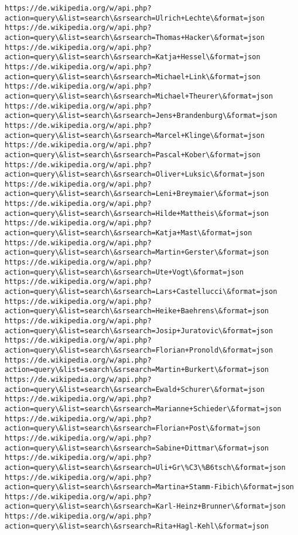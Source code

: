 \documentclass[11pt]{article}
\begin{document}
\begin{Verbatim}[commandchars=\\\{\}]
https://de.wikipedia.org/w/api.php?action=query\&list=search\&srsearch=Ulrich+Lechte\&format=json
https://de.wikipedia.org/w/api.php?action=query\&list=search\&srsearch=Thomas+Hacker\&format=json
https://de.wikipedia.org/w/api.php?action=query\&list=search\&srsearch=Katja+Hessel\&format=json
https://de.wikipedia.org/w/api.php?action=query\&list=search\&srsearch=Michael+Link\&format=json
https://de.wikipedia.org/w/api.php?action=query\&list=search\&srsearch=Michael+Theurer\&format=json
https://de.wikipedia.org/w/api.php?action=query\&list=search\&srsearch=Jens+Brandenburg\&format=json
https://de.wikipedia.org/w/api.php?action=query\&list=search\&srsearch=Marcel+Klinge\&format=json
https://de.wikipedia.org/w/api.php?action=query\&list=search\&srsearch=Pascal+Kober\&format=json
https://de.wikipedia.org/w/api.php?action=query\&list=search\&srsearch=Oliver+Luksic\&format=json
https://de.wikipedia.org/w/api.php?action=query\&list=search\&srsearch=Leni+Breymaier\&format=json
https://de.wikipedia.org/w/api.php?action=query\&list=search\&srsearch=Hilde+Mattheis\&format=json
https://de.wikipedia.org/w/api.php?action=query\&list=search\&srsearch=Katja+Mast\&format=json
https://de.wikipedia.org/w/api.php?action=query\&list=search\&srsearch=Martin+Gerster\&format=json
https://de.wikipedia.org/w/api.php?action=query\&list=search\&srsearch=Ute+Vogt\&format=json
https://de.wikipedia.org/w/api.php?action=query\&list=search\&srsearch=Lars+Castellucci\&format=json
https://de.wikipedia.org/w/api.php?action=query\&list=search\&srsearch=Heike+Baehrens\&format=json
https://de.wikipedia.org/w/api.php?action=query\&list=search\&srsearch=Josip+Juratovic\&format=json
https://de.wikipedia.org/w/api.php?action=query\&list=search\&srsearch=Florian+Pronold\&format=json
https://de.wikipedia.org/w/api.php?action=query\&list=search\&srsearch=Martin+Burkert\&format=json
https://de.wikipedia.org/w/api.php?action=query\&list=search\&srsearch=Ewald+Schurer\&format=json
https://de.wikipedia.org/w/api.php?action=query\&list=search\&srsearch=Marianne+Schieder\&format=json
https://de.wikipedia.org/w/api.php?action=query\&list=search\&srsearch=Florian+Post\&format=json
https://de.wikipedia.org/w/api.php?action=query\&list=search\&srsearch=Sabine+Dittmar\&format=json
https://de.wikipedia.org/w/api.php?action=query\&list=search\&srsearch=Uli+Gr\%C3\%B6tsch\&format=json
https://de.wikipedia.org/w/api.php?action=query\&list=search\&srsearch=Martina+Stamm-Fibich\&format=json
https://de.wikipedia.org/w/api.php?action=query\&list=search\&srsearch=Karl-Heinz+Brunner\&format=json
https://de.wikipedia.org/w/api.php?action=query\&list=search\&srsearch=Rita+Hagl-Kehl\&format=json

\end{Verbatim}
\end{document}
